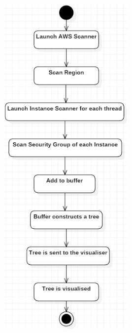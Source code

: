 \documentclass[a4paper,12pt]{report}
\begin{document}
	\begin{center}
		\includegraphics[width=0.5\textwidth] {./Diagrams/ScanInstancesSequence.png}\\[0.4cm]
	\end{center}
\end{document}
